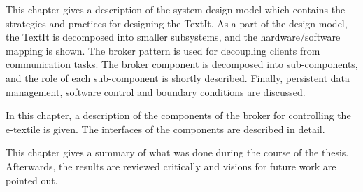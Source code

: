 \noindent  This chapter gives a description of the system design model which contains the strategies and practices for designing the TextIt. As a part of the design model, the TextIt is decomposed into smaller subsystems, and the hardware/software mapping is shown. The broker pattern is used for decoupling clients from communication tasks. The broker component is decomposed into sub-components, and the role of each sub-component is shortly described. Finally, persistent data management, software control and boundary conditions are discussed. \\

  \vspace{1mm}

\noindent In this chapter, a description of the components of the broker for controlling the e-textile is given. The interfaces of the components are described in detail. \\

  \vspace{1mm}

\noindent  This chapter gives a summary of what was done during the course of the thesis. Afterwards, the results are reviewed critically and visions for future work are pointed out. \\


